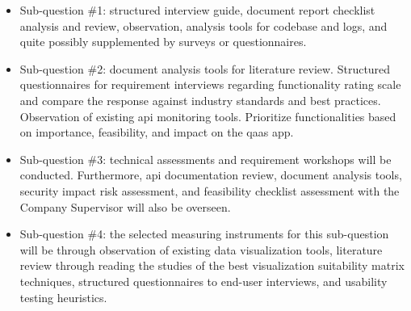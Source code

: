 \begin{itemize}[label=-]
      \item Sub-question \#1: structured interview guide, document report checklist analysis and review,
            observation, analysis tools for codebase and logs, and quite possibly supplemented by surveys
            or questionnaires.
      \item Sub-question \#2: document analysis tools for literature review. Structured questionnaires for
            requirement interviews regarding functionality rating scale and compare the response against
            industry standards and best practices. Observation of existing \acrshort{api} monitoring tools.
            Prioritize functionalities based on importance, feasibility, and impact on the \acrshort{qaas} app.
      \item Sub-question \#3: technical assessments and requirement workshops will be conducted. Furthermore,
            \acrshort{api} documentation  review, document analysis tools, security impact risk assessment,
            and feasibility checklist assessment with the Company Supervisor will also be overseen.
      \item Sub-question \#4: the selected measuring instruments for this sub-question will be through
            observation of existing data visualization tools, literature review through reading the studies of
            the best visualization suitability matrix techniques, structured questionnaires to end-user
            interviews, and usability testing heuristics.
\end{itemize}
